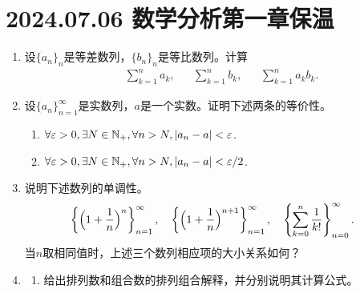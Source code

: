 \section*{2024.07.06 数学分析第一章保温}
\begin{enumerate}
    \item 设$\{a_n\}_{n}$是等差数列，$\{b_n\}_{n}$是等比数列。计算\begin{align*}
        &\sum_{k=1}^{n}a_k,&&\sum_{k=1}^{n}b_k,&&\sum_{k=1}^{n}a_kb_k.
    \end{align*}
    \item 设$\{a_n\}_{n=1}^\infty$是实数列，$a$是一个实数。证明下述两条的等价性。
    \begin{enumerate}
        \item $\forall \varepsilon>0, \exists N\in \mathbb{N_+}, \forall n>N, |a_n-a|<\varepsilon$.
        \item $\forall \varepsilon>0, \exists N\in \mathbb{N_+}, \forall n>N, |a_n-a|<\varepsilon/2$.
    \end{enumerate}
    \item 说明下述数列的单调性。
    \begin{align*}
        &\left\{\Bigl(1+\frac{1}{n}\Bigr)^n\right\}_{n=1}^\infty, && \left\{\Bigl(1+\frac{1}{n}\Bigr)^{n+1}\right\}_{n=1}^\infty, && \left\{\sum_{k=0}^{n}\frac{1}{k!}\right\}_{n=0}^\infty.
    \end{align*}
    当$n$取相同值时，上述三个数列相应项的大小关系如何？
    \item \begin{enumerate}
        \item 给出排列数和组合数的排列组合解释，并分别说明其计算公式。

\end{enumerate}
\end{enumerate}
